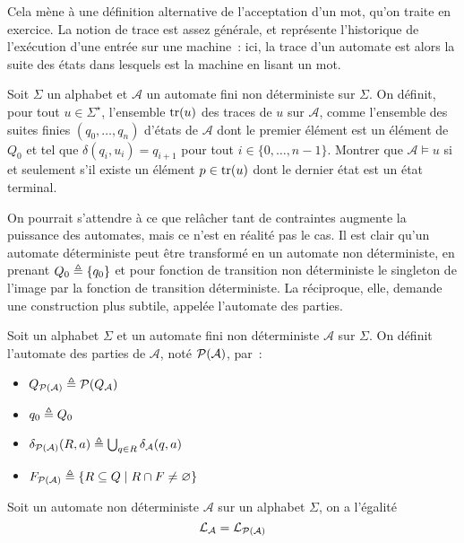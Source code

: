Cela mène à une définition alternative de l'acceptation d'un mot, qu'on traite
en exercice. La notion de trace est assez générale, et représente l'historique
de l'exécution d'une entrée sur une machine~: ici, la trace d'un automate est
alors la suite des états dans lesquels est la machine en lisant un mot.

\begin{exercise}\label{exo.traces.auto}
  Soit $\Sigma$ un alphabet et $\mathcal A$ un automate fini non déterministe
  sur $\Sigma$. On définit, pour tout $u \in \Sigma^\star$, l'ensemble $\operatorname{tr}(u)$
  des traces de $u$ sur $\mathcal A$, comme l'ensemble des suites finies
  $(q_0,\ldots,q_n)$ d'états de $\mathcal A$ dont le premier élément est un
  élément de $Q_0$ et tel que $\delta(q_i,u_i) = q_{i+1}$ pour tout
  $i \in \{0,\ldots,n-1\}$. Montrer que $\mathcal A \models u$ si et seulement
  s'il existe un élément $p \in \operatorname{tr}(u)$ dont le dernier état est un état
  terminal.
\end{exercise}

On pourrait s'attendre à ce que relâcher tant de contraintes augmente la
puissance des automates, mais ce n'est en réalité pas le cas. Il est clair qu'un
automate déterministe peut être transformé en un automate non déterministe, en
prenant $Q_0 \triangleq \{q_0\}$ et pour fonction de transition non déterministe le
singleton de l'image par la fonction de transition déterministe. La réciproque,
elle, demande une construction plus subtile, appelée l'automate des parties.

\begin{definition}
  Soit un alphabet $\Sigma$ et un automate fini non déterministe $\mathcal A$
  sur $\Sigma$. On définit l'automate des parties de $\mathcal A$, noté
  $\mathcal{P}(\mathcal A)$, par~:
  \begin{itemize}
  \item $Q_{\mathcal{P}(\mathcal A)} \triangleq \mathcal{P}(Q_\mathcal A)$
  \item $q_0 \triangleq Q_0$
  \item $\delta_{\mathcal{P}(\mathcal A)} (R,a) \triangleq
    \bigcup_{q \in R} \delta_{\mathcal A}(q,a)$
  \item $F_{\mathcal{P}(\mathcal A)} \triangleq \{R \subseteq Q\mid
    R\cap F \neq \varnothing\}$
  \end{itemize}
\end{definition}

\begin{proposition}
  Soit un automate non déterministe $\mathcal A$ sur un alphabet $\Sigma$, on a
  l'égalité
  \[\mathcal L_{\mathcal A} = \mathcal L_{\mathcal{P}(\mathcal A)}\]
\end{proposition}


